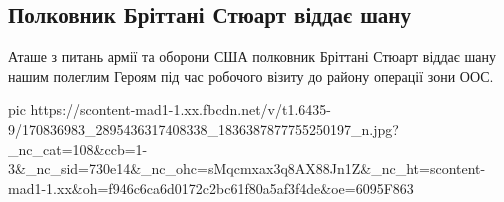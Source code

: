  
 
 
 
 
\subsection{Полковник Бріттані Стюарт віддає шану}

Аташе з питань армії та оборони США полковник Бріттані Стюарт віддає шану нашим
полеглим Героям під час робочого візиту до району операції зони ООС.


\ifcmt
  pic https://scontent-mad1-1.xx.fbcdn.net/v/t1.6435-9/170836983_2895436317408338_1836387877755250197_n.jpg?_nc_cat=108&ccb=1-3&_nc_sid=730e14&_nc_ohc=sMqcmxax3q8AX88Jn1Z&_nc_ht=scontent-mad1-1.xx&oh=f946c6ca6d0172c2bc61f80a5af3f4de&oe=6095F863
\fi

